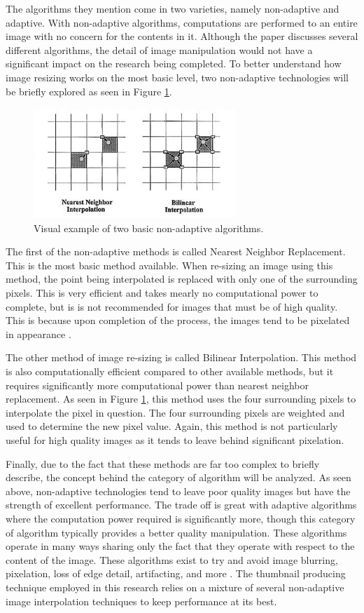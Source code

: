 The algorithms they mention come in two varieties, namely non-adaptive and adaptive. With non-adaptive algorithms, computations are performed to an entire image with no concern for the contents in it. Although the paper discusses several different algorithms, the detail of image manipulation would not have a significant impact on the research being completed. To better understand how image resizing works on the most basic level, two non-adaptive technologies will be briefly explored as seen in Figure \ref{interpolation}.

\begin{figure}[htbp]
\centering
\includegraphics[width=3in]{interpolation}
\caption{Visual example of two basic non-adaptive algorithms.}
\label{interpolation}
\end{figure}

The first of the non-adaptive methods is called Nearest Neighbor Replacement. This is the most basic method available. When re-sizing an image using this method, the point being interpolated is replaced with only one of the surrounding pixels. This is very efficient and takes mearly no computational power to complete, but is is not recommended for images that must be of high quality. This is because upon completion of the process, the images tend to be pixelated in appearance \cite{Acharya:2007}.

The other method of image re-sizing is called Bilinear Interpolation. This method is also computationally efficient compared to other available methods, but it requires significantly more computational power than nearest neighbor replacement. As seen in Figure \ref{interpolation}, this method uses the four surrounding pixels to interpolate the pixel in question. The four surrounding pixels are weighted and used to determine the new pixel value. Again, this method is not particularly useful for high quality images as it tends to leave behind significant pixelation.

Finally, due to the fact that these methods are far too complex to briefly describe, the concept behind the category of algorithm will be analyzed. As seen above, non-adaptive technologies tend to leave poor quality images but have the strength of excellent performance. The trade off is great with adaptive algorithms where the computation power required is significantly more, though this category of algorithm typically provides a better quality manipulation. These algorithms operate in many ways sharing only the fact that they operate with respect to the content of the image. These algorithms exist to try and avoid image blurring, pixelation, loss of edge detail, artifacting, and more \cite{Acharya:2007}. The thumbnail producing technique employed in this research relies on a mixture of several non-adaptive image interpolation techniques to keep performance at its best.